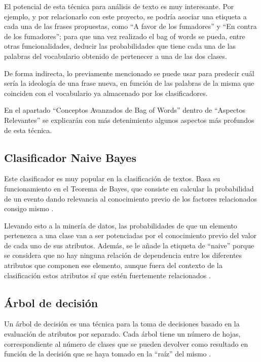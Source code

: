 El potencial de esta técnica para análisis de texto es muy interesante. Por ejemplo, y por relacionarlo con este proyecto, se podría asociar una etiqueta a cada una de las frases propuestas, como ``A favor de los fumadores'' y ``En contra de los fumadores''; para que una vez realizado el bag of words se pueda, entre otras funcionalidades, deducir las probabilidades que tiene cada una de las palabras del vocabulario obtenido de pertenecer a una de las dos clases.

De forma indirecta, lo previamente mencionado se puede usar para predecir cuál sería la ideología de una frase nueva, en función de las palabras de la misma que coinciden con el vocabulario ya almacenado por los clasificadores.

En el apartado ``Conceptos Avanzados de Bag of Words'' dentro de ``Aspectos Relevantes'' se explicarán con más detenimiento algunos aspectos más profundos de esta técnica.

\subsection{Clasificador Naive Bayes}

Este clasificador es muy popular en la clasificación de textos. Basa su funcionamiento en el Teorema de Bayes, que consiste en calcular la probabilidad de un evento dando relevancia al conocimiento previo de los factores relacionados consigo mismo \cite{wiki:bayestheorem}.

Llevando esto a la minería de datos, las probabilidades de que un elemento pertenezca a una clase van a ser potenciadas por el conocimiento previo del valor de cada uno de sus atributos. Además, se le añade la etiqueta de ``naive'' porque se considera que no hay ninguna relación de dependencia entre los diferentes atributos que componen ese elemento, aunque fuera del contexto de la clasificación estos atributos sí que estén fuertemente relacionados \cite{wiki:bayesclassifier}.

\subsection{Árbol de decisión}

Un árbol de decisión es una técnica para la toma de decisiones basado en la evaluación de atributos por separado. Cada árbol tiene un número de hojas, correspondiente al número de clases que se pueden devolver como resultado en función de la decisión que se haya tomado en la ``raíz'' del mismo \cite{wiki:decisiontree}.

